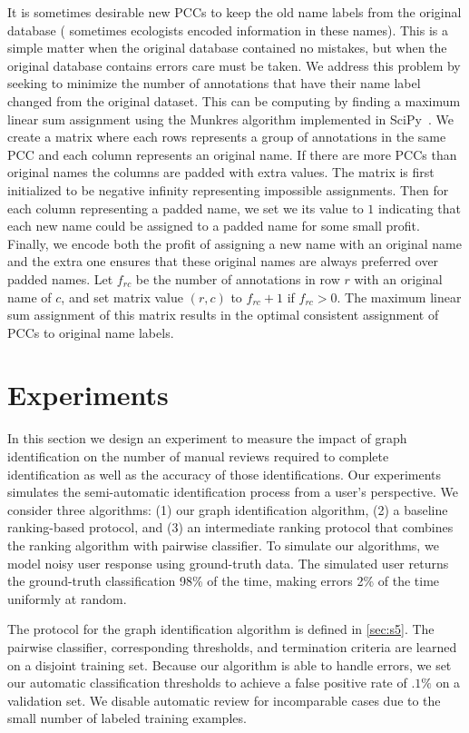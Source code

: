 It is sometimes desirable new PCCs to keep the old name labels from the original database (\eg{} sometimes ecologists
encoded information in these names). This is a simple matter when the original database contained no mistakes, but when
the original database contains errors care must be taken. We address this problem by seeking to minimize the number of
annotations that have their name label changed from the original dataset. This can be computing by finding a maximum
linear sum assignment using the Munkres algorithm implemented in SciPy~\cite{eric_jones_scipy_2001}. We create a matrix
where each rows represents a group of annotations in the same PCC and each column represents an original name. If there
are more PCCs than original names the columns are padded with extra values. The matrix is first initialized to be
negative infinity representing impossible assignments. Then for each column representing a padded name, we set we its
value to $1$ indicating that each new name could be assigned to a padded name for some small profit. Finally, we encode
both the profit of assigning a new name with an original name and the extra one ensures that these original names are
always preferred over padded names. Let $f_{rc}$ be the number of annotations in row $r$ with an original name of $c$,
and set matrix value $(r, c)$ to $f_{rc} + 1$ if $f_{rc} > 0$. The maximum linear sum assignment of this matrix results
in the optimal consistent assignment of PCCs to original name labels.
  
  
\section{Experiments}\label{sec:graphexpt}
    In this section we design an experiment to measure the impact of graph identification on the number of manual
    reviews required to complete identification as well as the accuracy of those identifications. Our experiments
    simulates the semi-automatic identification process from a user's perspective. We consider three algorithms: (1) our
    graph identification algorithm, (2) a baseline ranking-based protocol, and (3) an intermediate ranking protocol that
    combines the ranking algorithm with pairwise classifier. To simulate our algorithms, we model noisy user response
    using ground-truth data. The simulated user returns the ground-truth classification 98\% of the
    time, making errors 2\% of the time uniformly at random.

    The protocol for the graph identification algorithm is defined in \cref{sec:s5}. The pairwise classifier,
    corresponding thresholds, and termination criteria are learned on a disjoint training set. Because our algorithm is
    able to handle errors, we set our automatic classification thresholds to achieve a false positive rate of $.1\%$ 
    on a validation set. We disable automatic review for incomparable cases due to the small number of labeled training
    examples.

